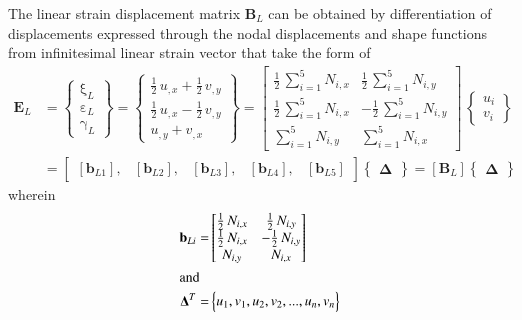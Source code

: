 The linear strain displacement matrix $\mathbf{B}_L$ can be obtained by differentiation of displacements expressed through the nodal displacements and shape functions from infinitesimal linear strain vector that take the form of
\begin{equation}
\begin{aligned}
\mathbf{E}_L & =  \begin{Bmatrix}
\mathrm \xi_{L} \\
\mathrm \varepsilon_{L} \\
\mathrm \gamma_{L} \end{Bmatrix} = 
\begin{Bmatrix}
\tfrac{1}{2} \, u_{,x} +   \tfrac{1}{2} \, v_{,y} \\
\tfrac{1}{2} \, u_{,x} - \tfrac{1}{2} \, v_{,y} \\
u_{,y} + v_{,x} \end{Bmatrix} = \begin{bmatrix}
\tfrac{1}{2} \, \sum\nolimits_{i=1}^5 N_{i,x}  & \tfrac{1}{2} \, \sum\nolimits_{i=1}^5 N_{i,y}  \\
\tfrac{1}{2} \, \sum\nolimits_{i=1}^5 N_{i,x}  & -\tfrac{1}{2} \, \sum\nolimits_{i=1}^5 N_{i,y}  \\ \sum\nolimits_{i=1}^5 N_{i,y}  & \sum\nolimits_{i=1}^5 N_{i,x}  \end{bmatrix} \, \begin{Bmatrix}
u_{i} \\
v_{i} \end{Bmatrix} \\
& = \begin{bmatrix}
[\mathbf{b}_{L1}], & [\mathbf{b}_{L2}], & [\mathbf{b}_{L3}], & [\mathbf{b}_{L4}], & [\mathbf{b}_{L5}] 
\end{bmatrix}  \begin{Bmatrix} \boldsymbol{\Delta} \end{Bmatrix}  
= [\mathbf{B}_L] \begin{Bmatrix} \boldsymbol{\Delta} \end{Bmatrix} 
\end{aligned}
\end{equation}
wherein 
\begin{subequations}
\begin{align}
\mathbf{b}_{Li} = & \begin{bmatrix}
\tfrac{1}{2} \, N_{i,x}  &  \tfrac{1}{2} \, N_{i,y} \\
\tfrac{1}{2} \, N_{i,x}  & - \tfrac{1}{2} \, N_{i,y} \\
N_{i,y} & N_{i,x}  \end{bmatrix}\\
\intertext{and}
\mathbf{\Delta}^T  = &
\begin{Bmatrix}
u_1, v_1, u_2, v_2, ...,u_n, v_n
\end{Bmatrix}
\end{align}
\end{subequations}
